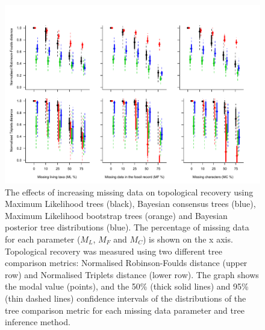 \documentclass[12pt,letterpaper]{article}
\begin{document}
\begin{figure} 
\centering
    \includegraphics[width=1\textwidth]{Figures/In_main/AllMethods-RF+Tr-colour.pdf}
\caption{The effects of increasing missing data on topological recovery using Maximum Likelihood trees (black), Bayesian consensus trees (blue), Maximum Likelihood bootstrap trees (orange) and Bayesian posterior tree distributions (blue). The percentage of missing data for each parameter ($M_{L}$, $M_{F}$ and $M_{C}$) is shown on the x axis. Topological recovery was measured using two different tree comparison metrics: Normalised Robinson-Foulds distance (upper row) and Normalised Triplets distance (lower row). The graph shows the modal value (points), and the 50\% (thick solid lines) and 95\% (thin dashed lines) confidence intervals of the distributions of the tree comparison metric for each missing data parameter and tree inference method.}
\label{Fig_Results-permeth_perparam} %
\end{figure}
\end{document}

